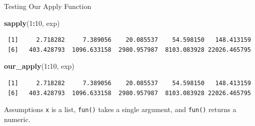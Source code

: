 \documentclass[
  ignorenonframetext,
  aspectratio=1610,
  onlytextwidth]{beamer}
\newenvironment{Shaded}{\begin{snugshade}}{\end{snugshade}}
\newcommand{\DecValTok}[1]{\textcolor[rgb]{0.00,0.00,0.81}{#1}}
\newcommand{\FunctionTok}[1]{\textcolor[rgb]{0.13,0.29,0.53}{\textbf{#1}}}
\newcommand{\NormalTok}[1]{#1}
\newcommand{\SpecialCharTok}[1]{\textcolor[rgb]{0.81,0.36,0.00}{\textbf{#1}}}
\begin{document}
\begin{frame}[fragile]{Testing Our Apply Function}
\label{testing-our-apply-function}
\begin{Shaded}
\begin{Highlighting}[]
\FunctionTok{sapply}\NormalTok{(}\DecValTok{1}\SpecialCharTok{:}\DecValTok{10}\NormalTok{, exp)}
\end{Highlighting}
\end{Shaded}

\begin{verbatim}
 [1]     2.718282     7.389056    20.085537    54.598150   148.413159
 [6]   403.428793  1096.633158  2980.957987  8103.083928 22026.465795
\end{verbatim}

\begin{Shaded}
\begin{Highlighting}[]
\FunctionTok{our\_apply}\NormalTok{(}\DecValTok{1}\SpecialCharTok{:}\DecValTok{10}\NormalTok{, exp)}
\end{Highlighting}
\end{Shaded}

\begin{verbatim}
 [1]     2.718282     7.389056    20.085537    54.598150   148.413159
 [6]   403.428793  1096.633158  2980.957987  8103.083928 22026.465795
\end{verbatim}

\pause

\begin{block}{Assumptions}
\label{assumptions}
\texttt{x} is a list, \texttt{fun()} takes a single argument, and
\texttt{fun()} returns a numeric.
\end{block}
\end{frame}
\end{document}
